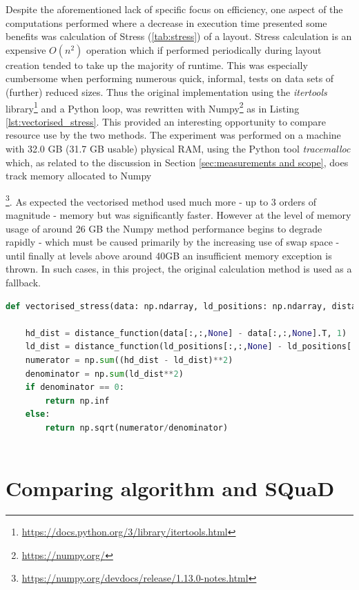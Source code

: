 \documentclass{l4proj}
\begin{document}
Despite the aforementioned lack of specific focus on efficiency, one aspect of the computations performed where a decrease in execution time presented some benefits was calculation of Stress (\ref{tab:stress}) of a layout. Stress calculation is an expensive $O(n^2)$ operation which if performed periodically during layout creation tended to take up the majority of runtime. This was especially cumbersome when performing numerous quick, informal, tests on data sets of (further) reduced  sizes. Thus the original implementation using the \emph {itertools} library\footnote{ \url{https://docs.python.org/3/library/itertools.html}} and a Python loop, was rewritten with Numpy\footnote{ \url{https://numpy.org/}} as in Listing \ref{lst:vectorised_stress}. This provided an interesting opportunity to compare resource use by the two methods. The experiment was performed on a machine with 32.0 GB (31.7 GB usable) physical RAM, using the Python tool \emph {tracemalloc} which, as related to the discussion in Section \ref{sec:measurements and scope}, does track memory allocated to Numpy{\footnote{\url{https://numpy.org/devdocs/release/1.13.0-notes.html}}. As expected the vectorised method used much more - up to 3 orders of magnitude - memory but was significantly faster. However at the level of memory usage of around 26 GB the Numpy method performance begins to degrade rapidly - which must be caused primarily by the increasing use of swap space - until finally at levels above around 40GB an insufficient memory exception is thrown. In such cases, in this project, the original calculation method is used as a fallback.

\begin{lstlisting}[language=python, float, caption={Python code to calculate vectorised Stress. A "distance\_function" retruns a norm of a numpy array (1st parameter) calculated along the specified axis (2nd parameter).}, label=lst:vectorised_stress]
def vectorised_stress(data: np.ndarray, ld_positions: np.ndarray, distance_function: Callable):
    
    hd_dist = distance_function(data[:,:,None] - data[:,:,None].T, 1)
    ld_dist = distance_function(ld_positions[:,:,None] - ld_positions[:,:,None].T, 1)
    numerator = np.sum((hd_dist - ld_dist)**2)
    denominator = np.sum(ld_dist**2)
    if denominator == 0:
        return np.inf
    else:
        return np.sqrt(numerator/denominator)
    
\end{lstlisting}


\section{Comparing \cite{Chalmers96} algorithm and SQuaD }}
\end{document}
